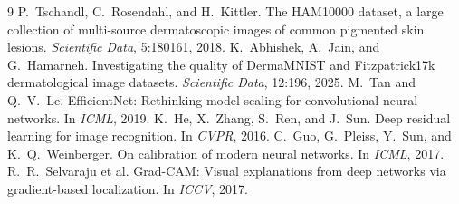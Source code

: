 \documentclass{article}
\begin{document}
{\footnotesize
\begin{thebibliography}{9}
\setlength{\itemsep}{0pt}
 P.~Tschandl, C.~Rosendahl, and H.~Kittler. The HAM10000 dataset, a large collection of multi-source dermatoscopic images of common pigmented skin lesions. \emph{Scientific Data}, 5:180161, 2018.
 K.~Abhishek, A.~Jain, and G.~Hamarneh. Investigating the quality of DermaMNIST and Fitzpatrick17k dermatological image datasets. \emph{Scientific Data}, 12:196, 2025.
 M.~Tan and Q.~V.~Le. EfficientNet: Rethinking model scaling for convolutional neural networks. In \emph{ICML}, 2019.
 K.~He, X.~Zhang, S.~Ren, and J.~Sun. Deep residual learning for image recognition. In \emph{CVPR}, 2016.
 C.~Guo, G.~Pleiss, Y.~Sun, and K.~Q.~Weinberger. On calibration of modern neural networks. In \emph{ICML}, 2017.
 R.~R.~Selvaraju et al. Grad-CAM: Visual explanations from deep networks via gradient-based localization. In \emph{ICCV}, 2017.
\end{thebibliography}
}
\end{document}
